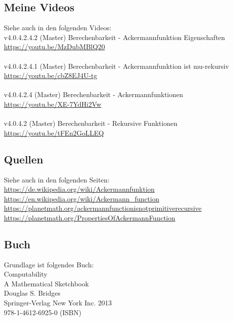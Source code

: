 \documentclass[a4paper]{amsart}
\theoremstyle{definition}
\begin{document}
\subsection*{Meine Videos}
Siehe auch in den folgenden Videos:\\
v4.0.4.2.4.2 (Master) Berechenbarkeit - Ackermannfunktion Eigenschaften\\
 \url{https://youtu.be/MzDubMBlQ20}\\
 \\
v4.0.4.2.4.1 (Master) Berechenbarkeit - Ackermannfunktion ist mu-rekursiv\\
 \url{https://youtu.be/cbZ8EJ4U-tg}\\
 \\
v4.0.4.2.4 (Master) Berechenbarkeit - Ackermannfunktionen\\
 \url{https://youtu.be/XE-7YdHi2Vw}\\
 \\
v4.0.4.2 (Master) Berechenbarkeit - Rekursive Funktionen\\
 \url{https://youtu.be/tFEn2GoLLEQ}

\subsection*{Quellen}
Siehe auch in den folgenden Seiten:\\
\url{https://de.wikipedia.org/wiki/Ackermannfunktion}\\
\url{https://en.wikipedia.org/wiki/Ackermann\_function}\\
\url{https://planetmath.org/ackermannfunctionisnotprimitiverecursive}\\
\url{https://planetmath.org/PropertiesOfAckermannFunction}

\subsection*{Buch}
Grundlage ist folgendes Buch:\\
Computability\\
A Mathematical Sketchbook\\
Douglas S. Bridges\\
Springer-Verlag New York Inc. 2013\\
978-1-4612-6925-0 (ISBN)
\end{document}
